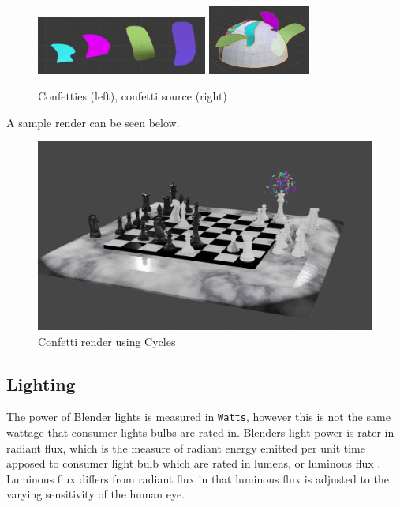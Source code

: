 \documentclass[11pt]{article}
\begin{document}
\begin{figure}[htbp]
\begin{center}
\includegraphics[width=0.5\textwidth]{Images/confetties.png}
\includegraphics[width=0.3\textwidth]{Images/confetti dome.png}
\end{center}
\caption{Confetties (left), confetti source (right)}
\end{figure}

A sample render can be seen below.
\begin{figure}[htbp]
\centering
\includegraphics[width=\textwidth]{Images/Confetti! cycles.png}
\caption{Confetti render using Cycles}
\end{figure}
\newpage
\subsection{Lighting}
\label{sec:org1e29e1b}
The power of Blender lights is measured in \texttt{Watts}, however this is not the same
wattage that consumer lights bulbs are rated in. Blenders light power is rater
in radiant flux, which is the measure of radiant energy emitted per unit time
apposed to consumer light bulb which are rated in lumens, or luminous flux
\cite{radiant-flux,luminous-flux}. Luminous flux differs from radiant flux in that
luminous flux is adjusted to the varying sensitivity of the human eye.
\cite{luminous-flux}
\end{document}
